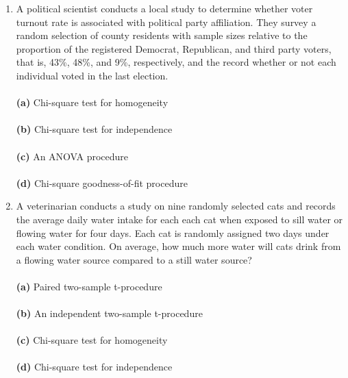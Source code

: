 \documentclass[12pt]{article}
\begin{document}
\begin{enumerate}[leftmargin=\labelsep]
\item A political scientist conducts a local study to determine whether voter turnout rate is associated with political party affiliation. They survey a random selection of county residents with sample sizes relative to the proportion of the registered Democrat, Republican, and third party voters, that is, 43\%, 48\%, and 9\%, respectively, and the record whether or not each individual voted in the last election.\\ \vspace{1mm}\\
{\bf (a)} \hspace{2mm} Chi-square test for homogeneity\\ \vspace{1mm}\\
{\bf (b)} \hspace{2mm} Chi-square test for independence\\   \vspace{1mm}\\
{\bf (c)} \hspace{2mm} An ANOVA procedure\\  \vspace{1mm}\\
{\bf (d)} \hspace{2mm} Chi-square goodness-of-fit procedure\\

\item A veterinarian conducts a study on nine randomly selected cats and records the average daily water intake for each each cat when exposed to sill water or flowing water for four days. Each cat is randomly assigned two days under each water condition. On average, how much more water will cats drink from a flowing water source compared to a still water source?\\ \vspace{1mm}\\
{\bf (a)} \hspace{2mm} Paired two-sample t-procedure\\ \vspace{1mm}\\
{\bf (b)} \hspace{2mm} An independent two-sample t-procedure\\   \vspace{1mm}\\
{\bf (c)} \hspace{2mm} Chi-square test for homogeneity\\  \vspace{1mm}\\
{\bf (d)} \hspace{2mm} Chi-square test for independence\\




\end{enumerate}
\end{document}
